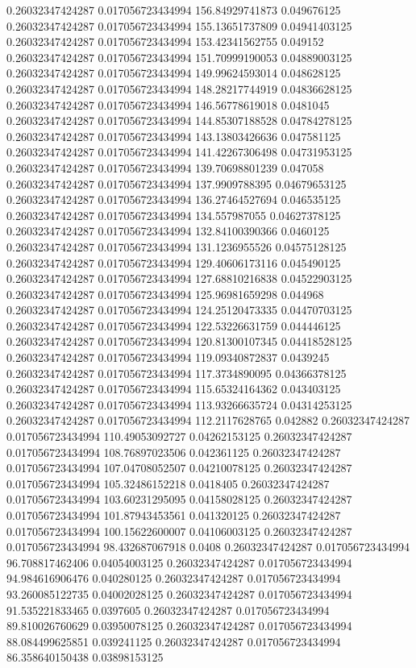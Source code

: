 0.26032347424287 0.017056723434994 156.84929741873 0.049676125
0.26032347424287 0.017056723434994 155.13651737809 0.04941403125
0.26032347424287 0.017056723434994 153.42341562755 0.049152
0.26032347424287 0.017056723434994 151.70999190053 0.04889003125
0.26032347424287 0.017056723434994 149.99624593014 0.048628125
0.26032347424287 0.017056723434994 148.28217744919 0.04836628125
0.26032347424287 0.017056723434994 146.56778619018 0.0481045
0.26032347424287 0.017056723434994 144.85307188528 0.04784278125
0.26032347424287 0.017056723434994 143.13803426636 0.047581125
0.26032347424287 0.017056723434994 141.42267306498 0.04731953125
0.26032347424287 0.017056723434994 139.70698801239 0.047058
0.26032347424287 0.017056723434994 137.9909788395 0.04679653125
0.26032347424287 0.017056723434994 136.27464527694 0.046535125
0.26032347424287 0.017056723434994 134.557987055 0.04627378125
0.26032347424287 0.017056723434994 132.84100390366 0.0460125
0.26032347424287 0.017056723434994 131.1236955526 0.04575128125
0.26032347424287 0.017056723434994 129.40606173116 0.045490125
0.26032347424287 0.017056723434994 127.68810216838 0.04522903125
0.26032347424287 0.017056723434994 125.96981659298 0.044968
0.26032347424287 0.017056723434994 124.25120473335 0.04470703125
0.26032347424287 0.017056723434994 122.53226631759 0.044446125
0.26032347424287 0.017056723434994 120.81300107345 0.04418528125
0.26032347424287 0.017056723434994 119.09340872837 0.0439245
0.26032347424287 0.017056723434994 117.3734890095 0.04366378125
0.26032347424287 0.017056723434994 115.65324164362 0.043403125
0.26032347424287 0.017056723434994 113.93266635724 0.04314253125
0.26032347424287 0.017056723434994 112.2117628765 0.042882
0.26032347424287 0.017056723434994 110.49053092727 0.04262153125
0.26032347424287 0.017056723434994 108.76897023506 0.042361125
0.26032347424287 0.017056723434994 107.04708052507 0.04210078125
0.26032347424287 0.017056723434994 105.32486152218 0.0418405
0.26032347424287 0.017056723434994 103.60231295095 0.04158028125
0.26032347424287 0.017056723434994 101.87943453561 0.041320125
0.26032347424287 0.017056723434994 100.15622600007 0.04106003125
0.26032347424287 0.017056723434994 98.432687067918 0.0408
0.26032347424287 0.017056723434994 96.708817462406 0.04054003125
0.26032347424287 0.017056723434994 94.984616906476 0.040280125
0.26032347424287 0.017056723434994 93.260085122735 0.04002028125
0.26032347424287 0.017056723434994 91.535221833465 0.0397605
0.26032347424287 0.017056723434994 89.810026760629 0.03950078125
0.26032347424287 0.017056723434994 88.084499625851 0.039241125
0.26032347424287 0.017056723434994 86.358640150438 0.03898153125
